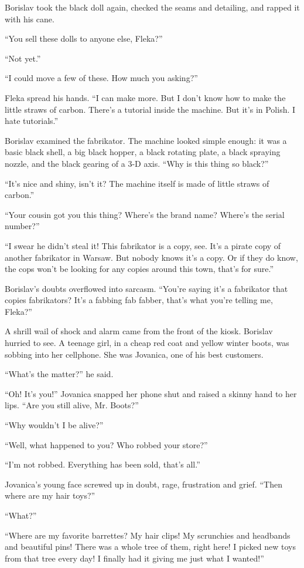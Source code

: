 \documentclass[20 pt,twoside,extrafontsizes,final]{memoir}
\begin{document}
Borislav took the black doll again, checked the seams and detailing, and rapped it with his cane. 

``You sell these dolls to anyone else, Fleka?''

``Not yet.''

``I could move a few of these. How much you asking?''

Fleka spread his hands. ``I can make more. But I don't know how to make the little straws of carbon. There's a tutorial inside the machine. But it's in Polish. I hate tutorials.''

Borislav examined the fabrikator. The machine looked simple enough: it was a basic black shell, a big black hopper, a black rotating plate, a black spraying nozzle, and the black gearing of a 3-D axis. ``Why is this thing so black?''

``It's nice and shiny, isn't it? The machine itself is made of little straws of carbon.''

``Your cousin got you this thing? Where's the brand name? Where's the serial number?''

``I swear he didn't steal it! This fabrikator is a copy, see. It's a pirate copy of another fabrikator in Warsaw. But nobody knows it's a copy. Or if they do know, the cops won't be looking for any copies around this town, that's for sure.''

Borislav's doubts overflowed into sarcasm. ``You're saying it's a fabrikator that copies fabrikators? It's a fabbing fab fabber, that's what you're telling me, Fleka?''

A shrill wail of shock and alarm came from the front of the kiosk. Borislav hurried to see.
A teenage girl, in a cheap red coat and yellow winter boots, was sobbing into her cellphone. She was Jovanica, one of his best customers.

``What's the matter?'' he said.

``Oh! It's you!'' Jovanica snapped her phone shut and raised a skinny hand to her lips. ``Are you still alive, Mr. Boots?''

``Why wouldn't I be alive?''

``Well, what happened to you? Who robbed your store?''

``I'm not robbed. Everything has been sold, that's all.''

Jovanica's young face screwed up in doubt, rage, frustration and grief. ``Then where are my hair toys?''

``What?''

``Where are my favorite barrettes? My hair clips! My scrunchies and headbands and beautiful pins! There was a whole tree of them, right here! I picked new toys from that tree every day! I finally had it giving me just what I wanted!''
\end{document}
